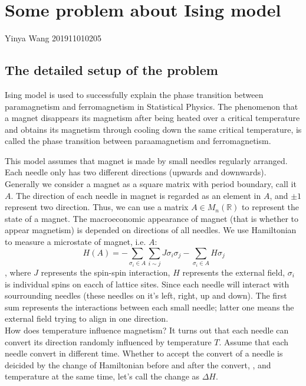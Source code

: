 \documentclass[11pt,openany]{book}              %
\begin{document}
                        
\chapter*{Some problem about Ising model}
\vspace{-1cm}
{\fontsize{18.0pt}{\baselineskip}\selectfont  Yinya Wang 201911010205}

\section{The detailed setup of the problem }
Ising model is used to successfully explain 
the phase transition between paramagnetism and ferromagnetism in Statistical Physics.
The phenomenon that a magnet disappears its magnetism after being heated over a critical 
temperature and obtains its magnetism through cooling down the same critical temperature, is called
the phase transition between paraamagnetism and ferromagnetism.

This model assumes that magnet is made by small needles regularly arranged. 
Each needle only has two different directions (upwards and downwards).
Generally we consider a magnet as a square matrix with period boundary, call it \(A\). 
The direction of each needle in magnet is regarded as an element in \(A\), and \(\pm 1\) represent
two direction. Thus, we can use a matrix \(A \in M_n(\mathbb{R})\) to represent the 
state of a magnet.
The macroeconomic appearance of magnet (that is whether to appear magnetism)
is depended on directions of all needles. 
We use Hamiltonian to measure a microstate of magnet, i.e. \(A\):
\begin{equation}
\, H(A)=-\sum_{\sigma_i \in A} \sum_{i \sim j} J \sigma_i \sigma_j-\sum_{\sigma_i \in A}H \sigma_j 
\end{equation}
, where \(J\) represents the spin-spin interaction, \(H\) represents the external field, 
\(\sigma_i\) is individual spins on eacch of lattice sites.
Since each needle will interact with sourrounding needles 
(these needles on it's left, right, up and down).
The first sum represents the interactions between each small needle; 
latter one means the external field trying to align in one direction.\\

How does temperature influence magnetism? It turns out 
that each needle can convert its direction randomly influenced by temperature \(T\).
Assume that each needle convert in different time.
Whether to accept the convert of a needle is deicided by the change of Hamiltonian before and after the convert,
, and temperature at the same time, let's call the change as \(\Delta H\).
\end{document}
